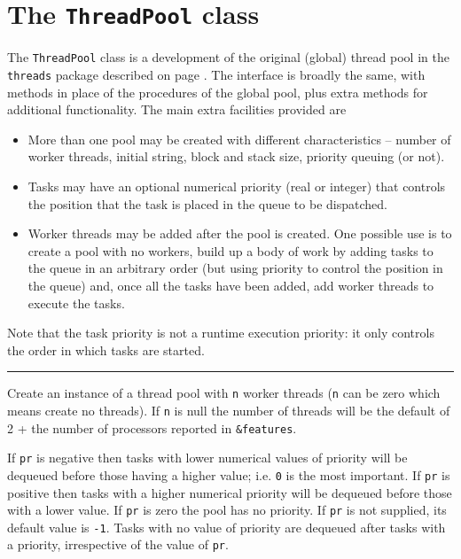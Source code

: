 \section{The \texttt{ThreadPool} class}
\label{ThreadPoolClass}
The \texttt{ThreadPool} class is a development of the original (global) thread pool
in the \texttt{threads} package described on page \pageref{SimpleThreadPool}.
The interface is broadly the same, with methods in place of the procedures of
the global pool, plus extra methods for additional functionality.
The main extra facilities provided are
\begin{itemize}
\item
  More than one pool may be created with different characteristics -- number
  of worker threads, initial string, block and stack size, priority queuing
  (or not).
\item
  Tasks may have an optional numerical priority (real or integer) that controls
  the position that the task is placed in the queue to be dispatched.
\item
  Worker threads may be added after the pool is created. One possible use
  is to create a pool with no workers, build up a body of work by adding
  tasks to the queue in an arbitrary order (but using priority to control
  the position in the queue) and, once all the tasks have been added, add
  worker threads to execute the tasks.
\end{itemize}
Note that the task priority is not a runtime execution priority: it only
controls the order in which tasks are started.

\bigskip\hrule\vspace{0.1cm}
\noindent{}

Create an instance of a thread pool with \texttt{n} worker threads (\texttt{n}
can be zero which means create no threads).
If \texttt{n} is null the number of threads will be the default of 2 + the
number of processors reported in \texttt{\&features}.

If \texttt{pr} is negative then tasks with lower numerical values of priority
will be dequeued before those having a higher value; i.e. \texttt{0} is the most
important.
%
If \texttt{pr} is positive then tasks with a higher numerical priority will be
dequeued before those with a lower value.
%
If \texttt{pr} is zero the pool has no priority.
%
If \texttt{pr} is not supplied, its default value is \texttt{-1}.
%
Tasks with no value of priority are dequeued after tasks with a priority,
irrespective of the value of \texttt{pr}.

